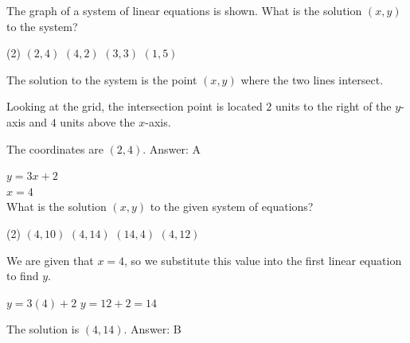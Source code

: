 \documentclass[11pt,paper=a4,answers]{exam}
\begin{document}
\begin{questions}
\vspace{1cm}

\question
\begin{center}
\end{center}
The graph of a system of linear equations is shown. What is the solution $(x, y)$ to the system?
\begin{tasks}(2)
\task $(2, 4)$
\task $(4, 2)$
\task $(3, 3)$
\task $(1, 5)$
\end{tasks}

\begin{solution}
The solution to the system is the point $(x, y)$ where the two lines intersect.
\vspace{5pt}
\begin{center}
Looking at the grid, the intersection point is located $2$ units to the right of the $y$-axis and $4$ units above the $x$-axis.
\end{center}
\vspace{5pt}
The coordinates are $(2, 4)$.
\vspace{5pt}
Answer: \colorbox{yellow!100}{A}
\end{solution}

\vspace{1cm}

\question
$y = 3x + 2$ \\
$x = 4$ \\
What is the solution $(x, y)$ to the given system of equations?
\begin{tasks}(2)
\task $(4, 10)$
\task $(4, 14)$
\task $(14, 4)$
\task $(4, 12)$
\end{tasks}

\begin{solution}
We are given that $x = 4$, so we substitute this value into the first linear equation to find $y$.
\vspace{5pt}
\begin{center}
$y = 3(4) + 2$
\vspace{5pt}
$y = 12 + 2 = 14$
\end{center}
\vspace{5pt}
The solution is $(4, 14)$.
\vspace{5pt}
Answer: \colorbox{yellow!100}{B}
\end{solution}


\end{questions}
\end{document}
